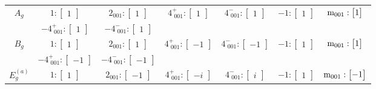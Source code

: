 \documentclass[fleqn,8pt,landscape]{jsarticle}
\begin{document}
\begin{longtable}{ccccccc}
$ A_{g} $ & $ 1:\begin{bmatrix} 1 \end{bmatrix} $ & $ 2{}_{001}:\begin{bmatrix} 1 \end{bmatrix} $ & $ 4^{+}_{\,\,001}:\begin{bmatrix} 1 \end{bmatrix} $ & $ 4^{-}_{\,\,001}:\begin{bmatrix} 1 \end{bmatrix} $ & $ -1:\begin{bmatrix} 1 \end{bmatrix} $ & $ {\rm m}_{001}:\begin{bmatrix} 1 \end{bmatrix} $ \\
& $ -4^{+}_{\,\,001}:\begin{bmatrix} 1 \end{bmatrix} $ & $ -4^{-}_{\,\,001}:\begin{bmatrix} 1 \end{bmatrix} $ & $  $ & $  $ & $  $ & $  $ \\ \hline
$ B_{g} $ & $ 1:\begin{bmatrix} 1 \end{bmatrix} $ & $ 2{}_{001}:\begin{bmatrix} 1 \end{bmatrix} $ & $ 4^{+}_{\,\,001}:\begin{bmatrix} -1 \end{bmatrix} $ & $ 4^{-}_{\,\,001}:\begin{bmatrix} -1 \end{bmatrix} $ & $ -1:\begin{bmatrix} 1 \end{bmatrix} $ & $ {\rm m}_{001}:\begin{bmatrix} 1 \end{bmatrix} $ \\
& $ -4^{+}_{\,\,001}:\begin{bmatrix} -1 \end{bmatrix} $ & $ -4^{-}_{\,\,001}:\begin{bmatrix} -1 \end{bmatrix} $ & $  $ & $  $ & $  $ & $  $ \\ \hline
$ E_{g}^{(a)} $ & $ 1:\begin{bmatrix} 1 \end{bmatrix} $ & $ 2{}_{001}:\begin{bmatrix} -1 \end{bmatrix} $ & $ 4^{+}_{\,\,001}:\begin{bmatrix} - i \end{bmatrix} $ & $ 4^{-}_{\,\,001}:\begin{bmatrix} i \end{bmatrix} $ & $ -1:\begin{bmatrix} 1 \end{bmatrix} $ & $ {\rm m}_{001}:\begin{bmatrix} -1 \end{bmatrix} $ \\

\end{longtable}
\end{document}
